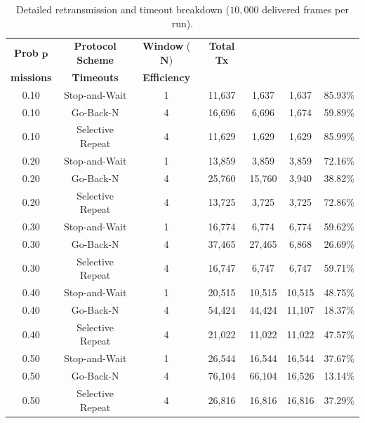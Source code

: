 \documentclass[11pt,a4paper]{article}
\begin{document}
\begin{table}[!htbp]
    \centering
    \footnotesize
    \renewcommand{\arraystretch}{0.90}
    \setlength{\tabcolsep}{5pt}
    \begin{tabular}{ccccccc}
        \toprule
        \textbf{Prob} \(\boldsymbol{p}\) & \textbf{Protocol Scheme} & \textbf{Window} (\(\boldsymbol{N}\)) & \textbf{Total Tx} & \shortstack{\textbf{Retrans-}\\\textbf{missions}} & \textbf{Timeouts} & \textbf{Efficiency} \\
        \midrule
        0.10 & Stop-and-Wait    & 1 & 11,637 & 1,637  & 1,637  & 85.93\% \\
        0.10 & Go-Back-N        & 4 & 16,696 & 6,696  & 1,674  & 59.89\% \\
        0.10 & Selective Repeat & 4 & 11,629 & 1,629  & 1,629  & 85.99\% \\
        \midrule
        0.20 & Stop-and-Wait    & 1 & 13,859 & 3,859  & 3,859  & 72.16\% \\
        0.20 & Go-Back-N        & 4 & 25,760 & 15,760 & 3,940  & 38.82\% \\
        0.20 & Selective Repeat & 4 & 13,725 & 3,725  & 3,725  & 72.86\% \\
        \midrule
        0.30 & Stop-and-Wait    & 1 & 16,774 & 6,774  & 6,774  & 59.62\% \\
        0.30 & Go-Back-N        & 4 & 37,465 & 27,465 & 6,868  & 26.69\% \\
        0.30 & Selective Repeat & 4 & 16,747 & 6,747  & 6,747  & 59.71\% \\
        \midrule
        0.40 & Stop-and-Wait    & 1 & 20,515 & 10,515 & 10,515 & 48.75\% \\
        0.40 & Go-Back-N        & 4 & 54,424 & 44,424 & 11,107 & 18.37\% \\
        0.40 & Selective Repeat & 4 & 21,022 & 11,022 & 11,022 & 47.57\% \\
        \midrule
        0.50 & Stop-and-Wait    & 1 & 26,544 & 16,544 & 16,544 & 37.67\% \\
        0.50 & Go-Back-N        & 4 & 76,104 & 66,104 & 16,526 & 13.14\% \\
        0.50 & Selective Repeat & 4 & 26,816 & 16,816 & 16,816 & 37.29\% \\
        \bottomrule
    \end{tabular}
    \caption{Detailed retransmission and timeout breakdown (\(10{,}000\) delivered frames per run).}
    \label{tab:test3_overhead}
\end{table}
\end{document}
